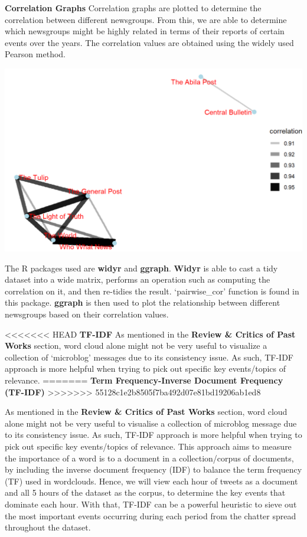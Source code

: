 \documentclass{acm_proc_article-sp}
\begin{document}
\textbf{Correlation Graphs} Correlation graphs are plotted to determine
the correlation between different newsgroups. From this, we are able to
determine which newsgroups might be highly related in terms of their
reports of certain events over the years. The correlation values are
obtained using the widely used Pearson method.

\includegraphics{img/image06.png}

The R packages used are \textbf{widyr} and \textbf{ggraph}.
\textbf{Widyr} is able to cast a tidy dataset into a wide matrix,
performs an operation such as computing the correlation on it, and then
re-tidies the result. `pairwise\_cor' function is found in this package.
\textbf{ggraph} is then used to plot the relationship between different
newsgroups based on their correlation values.

\textless\textless\textless\textless\textless\textless\textless{} HEAD
\textbf{TF-IDF} As mentioned in the \textbf{Review \& Critics of Past
Works} section, word cloud alone might not be very useful to visualize a
collection of `microblog' messages due to its consistency issue. As
such, TF-IDF approach is more helpful when trying to pick out specific
key events/topics of relevance. ======= \textbf{Term Frequency-Inverse
Document Frequency (TF-IDF)}
\textgreater\textgreater\textgreater\textgreater\textgreater\textgreater\textgreater{}
55128c1e2b8505f7ba492d07e81bd19206ab1ed8

As mentioned in the \textbf{Review \& Critics of Past Works} section,
word cloud alone might not be very useful to visualise a collection of
microblog message due to its consistency issue. As such, TF-IDF approach
is more helpful when trying to pick out specific key events/topics of
relevance. This approach aims to measure the importance of a word is to
a document in a collection/corpus of documents, by including the inverse
document frequency (IDF) to balance the term frequency (TF) used in
wordclouds. Hence, we will view each hour of tweets as a document and
all 5 hours of the dataset as the corpus, to determine the key events
that dominate each hour. With that, TF-IDF can be a powerful heuristic
to sieve out the most important events occurring during each period from
the chatter spread throughout the dataset.
\end{document}
